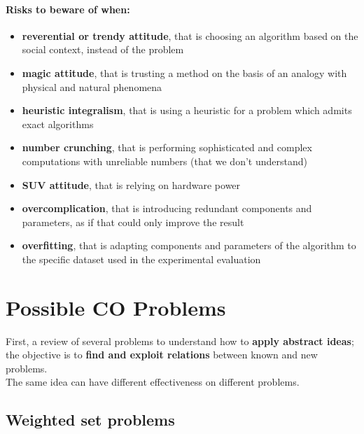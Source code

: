 \documentclass[11pt]{article}
\begin{document}
	\newpage
	
	\paragraph{Risks to beware of when:}
	\begin{itemize}
		\item \textbf{reverential or trendy attitude}, that is choosing an algorithm based on the social context, instead of the problem
		\item \textbf{magic attitude}, that is trusting a method on the basis of an analogy with physical and natural phenomena
		\item \textbf{heuristic integralism}, that is using a heuristic for a problem which admits exact algorithms
		\item \textbf{number crunching}, that is performing sophisticated and complex computations with unreliable numbers (that we don't understand)
		\item \textbf{SUV attitude}, that is relying on hardware power
		\item \textbf{overcomplication}, that is introducing redundant components and parameters, as if that could only improve the result
		\item \textbf{overfitting}, that is adapting components and parameters of the algorithm to the specific dataset used in the experimental evaluation
	\end{itemize}
	
	
	\newpage
	
	\section{Possible CO Problems}
	First, a review of several problems to understand how to \textbf{apply abstract ideas}; the objective is to \textbf{find and exploit relations} between known and new problems.\\
	The same idea can have different effectiveness on different problems.\\
	
	\subsection{Weighted set problems}
\end{document}
